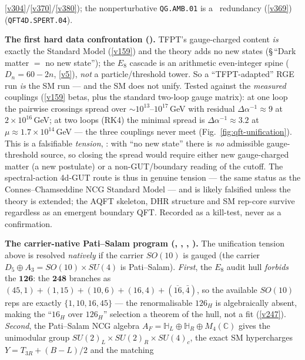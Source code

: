 \documentclass[11pt,a4paper]{article}
\begin{document}
\begin{keybox}
\vref{v304}/\vref{v370}/\vref{v380}); the nonperturbative \texttt{QG.AMB.01} is a \mC\ redundancy (\vref{v369})
(\texttt{QFT4D.SPERT.04}).
\par\smallskip\noindent\textbf{The first hard data confrontation
().} TFPT's gauge-charged content \emph{is} exactly the
Standard Model (\vref{v159}) and the theory adds no new states (\S\,``Dark matter $=$ no new state''); the
$E_8$ cascade is an arithmetic even-integer spine ($D_n{=}60{-}2n$, \vref{v5}), \emph{not} a
particle/threshold tower. So a ``TFPT-adapted'' RGE run \emph{is} the SM run --- and the SM does not unify.
Tested against the \emph{measured} couplings (\vref{v159} betas, plus the standard two-loop gauge matrix):
at one loop the pairwise crossings spread over ${\sim}10^{13}$--$10^{17}$\,GeV with residual
$\Delta\alpha^{-1}\approx9$ at $2{\times}10^{16}$\,GeV; at two loops (RK4) the minimal spread is
$\Delta\alpha^{-1}\approx3.2$ at $\mu\approx1.7{\times}10^{14}$\,GeV --- the three couplings never meet
(Fig.~\ref{fig:qft-unification}). This is a falsifiable \emph{tension}, \mX: with ``no new state'' there is
\emph{no} admissible gauge-threshold source, so closing the spread would require either new gauge-charged
matter (a new postulate) or a non-GUT/boundary reading of the cutoff. The spectral-action 4d-GUT route is
thus in genuine tension --- the same status as the Connes--Chamseddine NCG Standard Model --- and is likely
falsified unless the theory is extended; the AQFT skeleton, DHR structure and SM rep-core survive regardless
as an emergent boundary QFT. Recorded as a kill-test, never as a confirmation.
\par\smallskip\noindent\textbf{The carrier-native Pati--Salam program
(, , ,
).} The unification tension above is resolved \emph{natively} if the
carrier $SO(10)$ is gauged (the carrier $D_5{\oplus}A_3 = SO(10){\times}SU(4)$ is Pati--Salam). \emph{First},
the $E_8$ audit hull \emph{forbids} the $\mathbf{126}$: the $\mathbf{248}$ branches as
$(45,1){+}(1,15){+}(10,6){+}(16,4){+}(\overline{16},\bar4)$, so the available $SO(10)$ reps are exactly
$\{1,10,16,45\}$ --- the renormalisable $126_H$ is algebraically absent, making the
``$16_H$ over $126_H$'' selection a theorem of the hull, not a fit (\vref{v247}). \emph{Second}, the
Pati--Salam NCG algebra $A_F=\mathbb H_L\oplus\mathbb H_R\oplus M_4(\mathbb C)$ gives the unimodular group
$SU(2)_L{\times}SU(2)_R{\times}SU(4)_c$, the exact SM hypercharges $Y=T_{3R}+(B{-}L)/2$ and the matching

\end{keybox}
\end{document}
